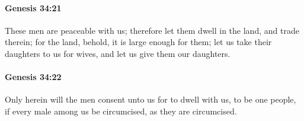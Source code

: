 		\paragraph{Genesis 34:21} %
			\label{GENESIS-34-21}

			These men are peaceable with us; therefore let them dwell in the land, and trade therein; for the land, behold, it is large enough for them; let us take their daughters to us for wives, and let us give them our daughters.


		\paragraph{Genesis 34:22} %
			\label{GENESIS-34-22}

			Only herein will the men consent unto us for to dwell with us, to be one people, if every male among us be circumcised, as they are circumcised.


